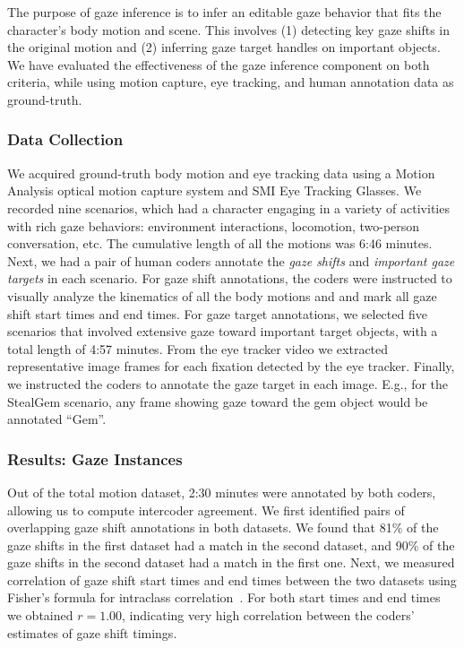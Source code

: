 The purpose of gaze inference is to infer an editable gaze behavior that fits the character's body motion and scene. This involves (1) detecting key gaze shifts in the original motion and (2) inferring gaze target handles on important objects. We have evaluated the effectiveness of the gaze inference component on both criteria, while using motion capture, eye tracking, and human annotation data as ground-truth.

\subsubsection{Data Collection}

We acquired ground-truth body motion and eye tracking data using a Motion Analysis optical motion capture system and SMI Eye Tracking Glasses. We recorded nine scenarios, which had a character engaging in a variety of activities with rich gaze behaviors: environment interactions, locomotion, two-person conversation, etc. The cumulative length of all the motions was 6:46 minutes. Next, we had a pair of human coders annotate the \emph{gaze shifts} and \emph{important gaze targets} in each scenario. For gaze shift annotations, the coders were instructed to visually analyze the kinematics of all the body motions and and mark all gaze shift start times and end times. For gaze target annotations, we selected five scenarios that involved extensive gaze toward important target objects, with a total length of 4:57 minutes. From the eye tracker video we extracted representative image frames for each fixation detected by the eye tracker. Finally, we instructed the coders to annotate the gaze target in each image. E.g., for the StealGem scenario, any frame showing gaze toward the gem object would be annotated ``Gem''.

\subsubsection{Results: Gaze Instances}

Out of the total motion dataset, 2:30 minutes were annotated by both coders, allowing us to compute intercoder agreement. We first identified pairs of overlapping gaze shift annotations in both datasets. We found that 81\% of the gaze shifts in the first dataset had a match in the second dataset, and 90\% of the gaze shifts in the second dataset had a match in the first one. Next, we measured correlation of gaze shift start times and end times between the two datasets using Fisher's formula for intraclass correlation~\citep{fisher1925statistical}. For both start times and end times we obtained $r = 1.00$, indicating very high correlation between the coders' estimates of gaze shift timings.

